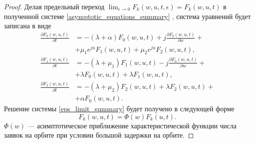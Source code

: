 \begin{proof}
	Делая предельный переход $ \lim_{\epsilon \xrightarrow{} 0} F_{k}(w,u,t,\epsilon) = F_{k}(w,u,t)$  в полученной системе \eqref{asymptotic_equations_summary} , система уравнений будет записана в виде
	\begin{equation} \label{eps_limit_summary}
		\begin{split}
			\frac{{\partial F_{0}(w,u,t)}}{{\partial t}} &= -(\lambda + \alpha)F_{0}(w,u,t) + j
			\frac{{\partial F_{0}(w,u,t)}}{{\partial w}} +\\  &+ \mu_{1} e^{ju}F_{1}(w,u,t) + \mu_{2}e^{ju}F_{2}(w,u,t) ,
			\\
			\frac{{\partial F_{1}(w,u,t)}}{{\partial t}} &= -(\lambda + \mu_{1})F_{1}(w,u,t) - j 
			\frac{{\partial F_{0}(w,u,t)}}{{\partial w}} +\\  &+ \lambda F_{0}(w,u,t) + \lambda F_{1}(w,u,t),
			\\
			\frac{{\partial F_{2}(w,u,t)}}{{\partial t}} &= -(\lambda + \mu_{2})F_{2}(w,u,t)  + \lambda F_{2}(w,u,t) +\\  &+ \alpha F_{0}(w,u,t).
		\end{split}
	\end{equation}  
	Решение системы \eqref{eps_limit_summary} будет получено в следующей форме
	\begin{equation} \label{solution_form_summary}
		F_{k}(w,u,t) = \Phi(w)F_{k}(u,t).
	\end{equation}  
	$\Phi(w)$ --- асимптотическое приближение характеристической функции числа заявок на орбите при условии большой задержки на орбите.
	

\end{proof}
